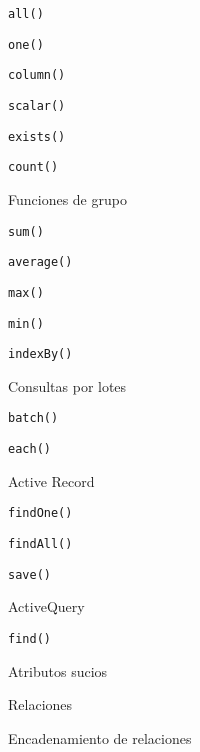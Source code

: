 \begin{longenum}
\begin{longenum}
\begin{longenum}
            \begin{longenum}
                \item \texttt{all()}
                \item \texttt{one()}
                \item \texttt{column()}
                \item \texttt{scalar()}
                \item \texttt{exists()}
                \item \texttt{count()}
                \item Funciones de grupo
                \begin{longenum}
                    \item \texttt{sum()}
                    \item \texttt{average()}
                    \item \texttt{max()}
                    \item \texttt{min()}
                \end{longenum}
                \item \texttt{indexBy()}
            \end{longenum}
            \item Consultas por lotes
            \begin{longenum}
                \item \texttt{batch()}
                \item \texttt{each()}
            \end{longenum}
        \end{longenum}
        \item Active Record
        \begin{longenum}
            \item \texttt{findOne()}
            \item \texttt{findAll()}
            \item \texttt{save()}
            \item ActiveQuery
            \begin{longenum}
                \item \texttt{find()}
            \end{longenum}
            \item Atributos sucios
            \item Relaciones
            \begin{longenum}
                \item Encadenamiento de relaciones

\end{longenum}
\end{longenum}
\end{longenum}
\end{longenum}
